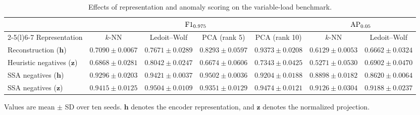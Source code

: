\begin{table}[!ht]
\centering
\caption{Effects of representation and anomaly scoring on the variable-load benchmark.}
\label{tab:representation_vs_scorer}
\footnotesize
\setlength{\tabcolsep}{3pt}
\renewcommand{\arraystretch}{1.17}
\begin{tabular*}{\textwidth}{@{\extracolsep{\fill}}lcccccc@{}}
\toprule
& \multicolumn{4}{c}{$\mathrm{F1}_{0.975}$} & \multicolumn{2}{c}{$\mathrm{AP}_{0.05}$} \\
\cmidrule(lr){2-5}\cmidrule(l){6-7}
Representation & $k$-NN & Ledoit--Wolf & PCA (rank 5) & PCA (rank 10) & $k$-NN & Ledoit--Wolf \\
\midrule
Reconstruction ($\mathbf h$) & $0.7090 \pm 0.0067$ & $0.7671 \pm 0.0289$ & $0.8293 \pm 0.0597$ & $0.9373 \pm 0.0208$ & $0.6129 \pm 0.0053$ & $0.6662 \pm 0.0324$ \\
Heuristic negatives ($\mathbf z$) & $0.6868 \pm 0.0281$ & $0.8042 \pm 0.0247$ & $0.6674 \pm 0.0606$ & $0.7343 \pm 0.0425$ & $0.5271 \pm 0.0530$ & $0.6902 \pm 0.0470$ \\
SSA negatives ($\mathbf h$) & $0.9296 \pm 0.0203$ & $0.9421 \pm 0.0037$ & $0.9502 \pm 0.0036$ & $0.9204 \pm 0.0188$ & $0.8898 \pm 0.0182$ & $0.8620 \pm 0.0064$ \\
SSA negatives ($\mathbf z$) & $0.9415 \pm 0.0125$ & $0.9504 \pm 0.0109$ & $0.9351 \pm 0.0129$ & $0.9474 \pm 0.0121$ & $0.9126 \pm 0.0304$ & $0.9188 \pm 0.0237$ \\
\bottomrule
\end{tabular*}
\par\smallskip\parbox{\textwidth}{Values are mean $\pm$ SD over ten seeds. $\mathbf h$ denotes the encoder representation, and $\mathbf z$ denotes the normalized projection.}
\end{table}
